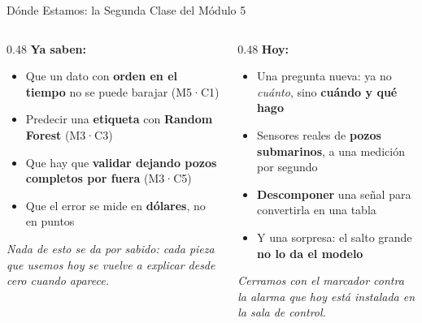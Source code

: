 \documentclass[aspectratio=169, 11pt]{beamer}
\begin{document}
\begin{frame}[shrink=8]{Dónde Estamos: la Segunda Clase del Módulo 5}
  \vspace{-4pt}
  \begin{columns}[T]
    \begin{column}{0.48\textwidth}
      {\small\color{arcaDark}\bfseries\faCheckCircle\hspace{5pt}Ya saben:}
      \vspace{4pt}
      {\footnotesize\color{textMuted}
      \begin{itemize}\setlength{\itemsep}{3pt}
        \item[{\color{codeGreen}\scriptsize\faCheck}]
          Que un dato con \textbf{orden en el tiempo} no se puede barajar (M5·C1)
        \item[{\color{codeGreen}\scriptsize\faCheck}]
          Predecir una \textbf{etiqueta} con \textbf{Random Forest} (M3·C3)
        \item[{\color{codeGreen}\scriptsize\faCheck}]
          Que hay que \textbf{validar dejando pozos completos por fuera} (M3·C5)
        \item[{\color{codeGreen}\scriptsize\faCheck}]
          Que el error se mide en \textbf{dólares}, no en puntos
      \end{itemize}
      }
      \vspace{5pt}
      {\scriptsize\color{textMuted}\itshape
        Nada de esto se da por sabido: cada pieza que usemos hoy
        se vuelve a explicar desde cero cuando aparece.}
    \end{column}
    \begin{column}{0.48\textwidth}
      {\small\color{arcaDark}\bfseries\faForward\hspace{5pt}Hoy:}
      \vspace{4pt}
      {\footnotesize\color{textMuted}
      \begin{itemize}\setlength{\itemsep}{3pt}
        \item[{\color{arcaRed}\scriptsize\faArrowRight}]
          Una pregunta nueva: ya no \emph{cuánto}, sino \textbf{cuándo y qué hago}
        \item[{\color{arcaRed}\scriptsize\faArrowRight}]
          Sensores reales de \textbf{pozos submarinos}, a una medición por segundo
        \item[{\color{arcaRed}\scriptsize\faArrowRight}]
          \textbf{Descomponer} una señal para convertirla en una tabla
        \item[{\color{arcaRed}\scriptsize\faStar}]
          Y una sorpresa: el salto grande \textbf{no lo da el modelo}
      \end{itemize}
      }
      \vspace{4pt}
      {\scriptsize\color{arcaDark}\itshape
        Cerramos con el marcador contra la alarma
        que hoy está instalada en la sala de control.}
    \end{column}
  \end{columns}
\end{frame}
\end{document}
